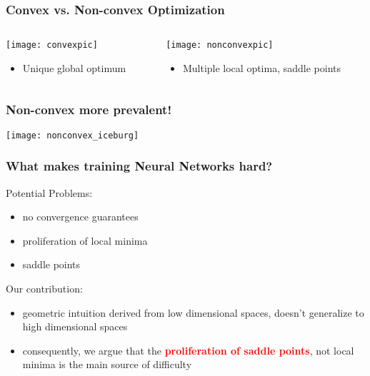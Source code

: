 \documentclass{beamer}
\begin{document}
\begin{frame}
\frametitle{Convex vs. Non-convex Optimization}

\vspace{-0.18in}

\begin{columns}[T]
\begin{column}{.5\textwidth}
\begin{block}{}

\center
\texttt{[image: convexpic]}

\begin{itemize}
\item{Unique global optimum}
\end{itemize}
\end{block}
\end{column}

\begin{column}{.5\textwidth}
\begin{block}{}
\center
\texttt{[image: nonconvexpic]}

\begin{itemize}
\item{Multiple local optima, saddle points}
\end{itemize}
\end{block}
\end{column}
\end{columns}

\end{frame}


\begin{frame}
\frametitle{Non-convex more prevalent!}
\center
\texttt{[image: nonconvex\_iceburg]}
\end{frame}

\begin{frame}
\frametitle{What makes training Neural Networks hard?}
\vspace{5pt}

\pause
\begin{block}{Potential Problems:}
\begin{itemize}
\pause
\item{no convergence guarantees}
\pause
\item{proliferation of local minima}
\pause
\item{saddle points}
\pause
\end{itemize}
\end{block}

\begin{block}{Our contribution:}
\begin{itemize}
\pause
\item{geometric intuition derived from low dimensional spaces, doesn't generalize to high dimensional spaces}
\pause
\item{consequently, we argue that the \textcolor{red}{\textbf{proliferation of saddle points}}, not local minima is the main source of difficulty}
\end{itemize}
\end{block}

\end{frame}
\end{document}
